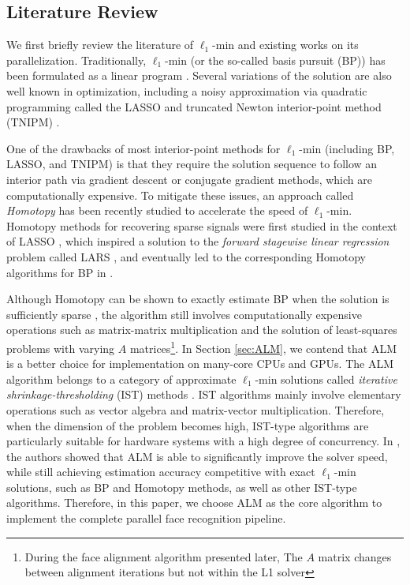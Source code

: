 \documentclass[10pt,twocolumn,letterpaper]{article}
\begin{document}
\subsection{Literature Review} 
We first briefly review the literature of $\ell_1$-min and existing
works on its parallelization.  Traditionally, $\ell_1$-min (or the so-called
basis pursuit (BP)) has been formulated as a linear program
\cite{ChenS2001-SIAM}. Several variations of the solution are also well known
in optimization, including a noisy approximation via quadratic programming
called the LASSO \cite{TibshiraniR1996} and truncated Newton interior-point
method (TNIPM) \cite{KimS2007}.

One of the drawbacks of most interior-point methods for $\ell_1$-min (including
BP, LASSO, and TNIPM) is that they require the solution sequence to follow an
interior path via gradient descent or conjugate gradient methods, which are computationally expensive.
To mitigate these issues, an approach called \emph{Homotopy} has been recently studied to accelerate the
speed of $\ell_1$-min. Homotopy methods for recovering sparse signals were
first studied in the context of LASSO \cite{OsborneM2000}, which inspired a
solution to the \emph{forward stagewise linear regression} problem called LARS
\cite{EfronB2004}, and eventually led to the corresponding Homotopy algorithms
for BP in \cite{MalioutovD2005,DonohoD2006}.

Although Homotopy can be shown to exactly estimate BP when the solution is
sufficiently sparse \cite{DonohoD2006}, the algorithm still involves
computationally expensive operations such as matrix-matrix multiplication and
the solution of least-squares problems with varying $A$
matrices\footnote{During the face alignment algorithm presented later, The $A$
matrix changes between alignment iterations but not within the L1 solver}.  In
Section \ref{sec:ALM}, we contend that ALM is a better choice for
implementation on many-core CPUs and GPUs. The ALM algorithm belongs to a
category of approximate $\ell_1$-min solutions called \emph{iterative
shrinkage-thresholding} (IST) methods \cite{WrightS2008,BeckA2009}.  IST
algorithms mainly involve elementary operations such as vector algebra and
matrix-vector multiplication. Therefore, when the dimension of the problem
becomes high, IST-type algorithms are particularly suitable for hardware
systems with a high degree of concurrency. In \cite{YangA2010-ICIP}, the
authors showed that ALM is able to significantly improve the solver speed,
while still achieving estimation accuracy competitive with exact $\ell_1$-min
solutions, such as BP and Homotopy methods, as well as other IST-type
algorithms.  Therefore, in this paper, we choose ALM as the core algorithm to
implement the complete parallel face recognition pipeline.
\end{document}
